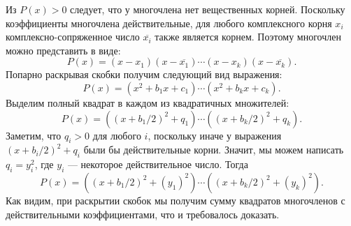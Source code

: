 \documentclass{article}
\begin{document}
Из $P(x) > 0$ следует, что у многочлена нет вещественных корней. Поскольку коэффициенты многочлена действительные, для любого комплексного корня $x_i$ комплексно-сопряженное число $\overline{x_i}$ также является корнем. Поэтому многочлен можно представить в виде:
$$P(x) = (x - x_1)(x - \overline{x_1}) \cdots (x-x_k)(x - \overline{x_k}).$$
Попарно раскрывая скобки получим следующий вид выражения:
$$P(x) = (x^2 + b_1x + c_1) \cdots (x^2 + b_kx + c_k).$$
Выделим полный квадрат в каждом из квадратичных множителей:
$$P(x) = ((x + b_1/2)^2 + q_1) \cdots ((x + b_k/2)^2 + q_k).$$
Заметим, что $q_i > 0$ для любого $i$, поскольку иначе у выражения $(x + b_i/2)^2 + q_i$ были бы действительные корни. Значит, мы можем написать $q_i = y_i^2$, где $y_i$ --- некоторое действительное число. Тогда
$$P(x) = ((x + b_1/2)^2 + (y_1)^2) \cdots ((x + b_k/2)^2 + (y_k)^2).$$
Как видим, при раскрытии скобок мы получим сумму квадратов многочленов с действительными коэффициентами, что и требовалось доказать.
\end{document}
